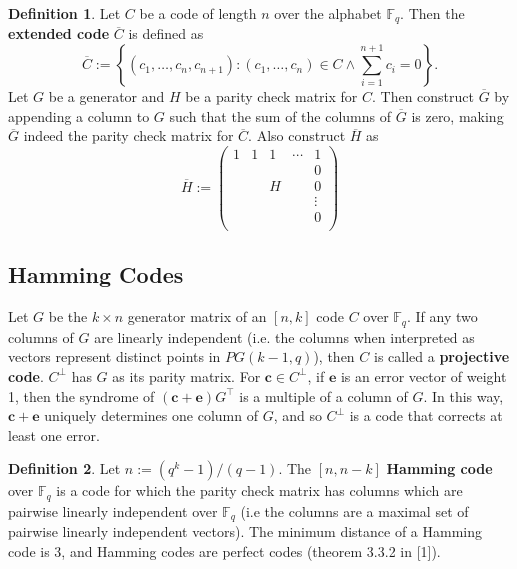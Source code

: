 \documentclass{article}
\newcommand{\F}{\mathbb{F}}
\newcommand{\dual}[1]{#1^\bot}
\newcommand{\trans}[1]{#1^\top}
\newcommand{\ext}[1]{\overline{#1}}
\renewcommand{\=}{\equiv}
\newcommand{\set}[1]{\left\{ #1 \right\}}
\renewcommand{\v}{\mathbf}
\theoremstyle{plain}
\theoremstyle{definition}
\newtheorem{defn}{Definition}[subsection]
\begin{document}
\begin{defn}
Let $C$ be a code of length $n$ over the alphabet $\F_q$.
Then the \textbf{extended code} $\ext{C}$ is defined as
$$ \ext{C} := \set{ (c_1, \dots, c_n, c_{n+1}) : (c_1, \dots, c_n) \in C \land \sum_{i=1}^{n+1} c_i = 0 }. $$
Let $G$ be a generator and $H$ be a parity check matrix for $C$.
Then construct $\ext{G}$ by appending a column to $G$ such that the sum of the columns of $\ext{G}$ is zero, making $\ext{G}$ indeed the parity check matrix for $\ext{C}$.
Also construct $\ext{H}$ as
\begin{equation}
  \ext{H} := \begin{pmatrix}
    1 & 1 & 1 & \cdots & 1 \\
      &   &   &       & 0 \\
      &   & H &       & 0 \\
      &   &   &       & \vdots \\
      &   &   &       & 0 \\
  \end{pmatrix}
\end{equation}
\end{defn}

\subsection{Hamming Codes}

Let $G$ be the $k \times n$ generator matrix of an $[n,k]$ code $C$ over $\F_q$.
If any two columns of $G$ are linearly independent (i.e. the columns when interpreted as vectors represent distinct points in $PG(k-1, q)$), then $C$ is called a \textbf{projective code}.
$\dual C$ has $G$ as its parity matrix.
For $\v c \in \dual C$, if $\v e$ is an error vector of weight 1, then the syndrome of $(\v c + \v e) \trans G$ is a multiple of a column of $G$.
In this way, $\v c + \v e$ uniquely determines one column of $G$, and so $\dual C$ is a code that corrects at least one error.

\begin{defn}
\label{def:hamming-code}
Let $n := (q^k - 1)/(q - 1)$.
The $[n, n-k]$ \textbf{Hamming code} over $\F_q$ is a code for which the parity check matrix has columns which are pairwise linearly independent over $\F_q$ (i.e the columns are a maximal set of pairwise linearly independent vectors).
The minimum distance of a Hamming code is 3, and Hamming codes are perfect codes (theorem 3.3.2 in [1]).
\end{defn}
\end{document}
